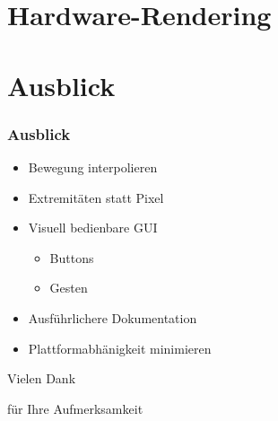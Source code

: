 \documentclass{beamer}
\begin{document}
\section{Hardware-Rendering}


\section{Ausblick}

\begin{frame}
\frametitle{Ausblick}
\begin{itemize}
	\item Bewegung interpolieren
	\item Extremitäten statt Pixel
	\item Visuell bedienbare GUI
	\begin{itemize}
		\item Buttons
		\item Gesten
	\end{itemize}
	\item Ausführlichere Dokumentation
	\item Plattformabhänigkeit minimieren
\end{itemize}
\end{frame}

\begin{frame}
\Huge
\centerline{Vielen Dank}
\centerline{für Ihre Aufmerksamkeit}
\end{frame}
\end{document}
